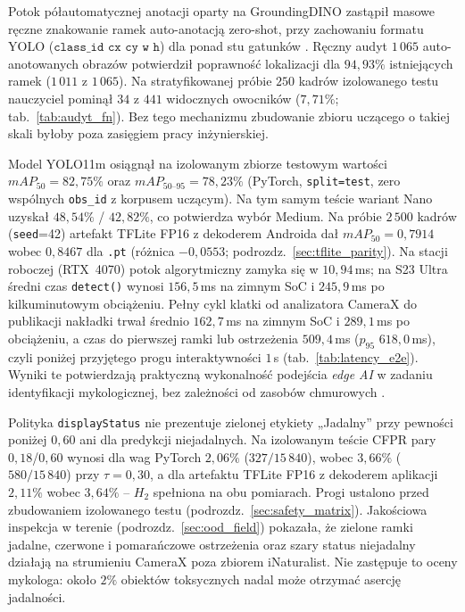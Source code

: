Potok półautomatycznej anotacji oparty na GroundingDINO zastąpił masowe ręczne znakowanie ramek auto-anotacją zero-shot, przy zachowaniu formatu YOLO ($\texttt{class\_id cx cy w h}$) dla ponad stu gatunków \cite{liu2023grounding}. Ręczny audyt $1\,065$ auto-anotowanych obrazów potwierdził poprawność lokalizacji dla $94{,}93\%$ istniejących ramek ($1\,011$ z $1\,065$). Na stratyfikowanej próbie $250$ kadrów izolowanego testu nauczyciel pominął $34$ z $441$ widocznych owocników ($7{,}71\%$; tab.~\ref{tab:audyt_fn}). Bez tego mechanizmu zbudowanie zbioru uczącego o takiej skali byłoby poza zasięgiem pracy inżynierskiej.

Model YOLO11m osiągnął na izolowanym zbiorze testowym wartości $mAP_{50}=82{,}75\%$ oraz $mAP_{50\text{--}95}=78{,}23\%$ (PyTorch, \texttt{split=test}, zero wspólnych \texttt{obs\_id} z korpusem uczącym). Na tym samym teście wariant Nano uzyskał $48{,}54\%$ / $42{,}82\%$, co potwierdza wybór Medium. Na próbie $2\,500$ kadrów (\texttt{seed}=42) artefakt TFLite FP16 z dekoderem Androida dał $mAP_{50}=0{,}7914$ wobec $0{,}8467$ dla \texttt{.pt} (różnica $-0{,}0553$; podrozdz.~\ref{sec:tflite_parity}). Na stacji roboczej (RTX~4070) potok algorytmiczny zamyka się w $10{,}94$\,ms; na S23 Ultra średni czas \texttt{detect()} wynosi $156{,}5$\,ms na zimnym SoC i $245{,}9$\,ms po kilkuminutowym obciążeniu. Pełny cykl klatki od analizatora CameraX do publikacji nakładki trwał średnio $162{,}7$\,ms na zimnym SoC i $289{,}1$\,ms po obciążeniu, a czas do pierwszej ramki lub ostrzeżenia $509{,}4$\,ms ($p_{95}$ $618{,}0$\,ms), czyli poniżej przyjętego progu interaktywności $1$\,s (tab.~\ref{tab:latency_e2e}). Wyniki te potwierdzają praktyczną wykonalność podejścia \textit{edge AI} w zadaniu identyfikacji mykologicznej, bez zależności od zasobów chmurowych \cite{ultralytics2024yolo11}.

Polityka \texttt{displayStatus} nie prezentuje zielonej etykiety „Jadalny” przy pewności poniżej $0{,}60$ ani dla predykcji niejadalnych. Na izolowanym teście CFPR pary $0{,}18$/$0{,}60$ wynosi dla wag PyTorch $2{,}06\%$ ($327/15\,840$), wobec $3{,}66\%$ ($580/15\,840$) przy $\tau=0{,}30$, a dla artefaktu TFLite FP16 z dekoderem aplikacji $2{,}11\%$ wobec $3{,}64\%$ -- $H_2$ spełniona na obu pomiarach. Progi ustalono przed zbudowaniem izolowanego testu (podrozdz.~\ref{sec:safety_matrix}). Jakościowa inspekcja w terenie (podrozdz.~\ref{sec:ood_field}) pokazała, że zielone ramki jadalne, czerwone i pomarańczowe ostrzeżenia oraz szary status niejadalny działają na strumieniu CameraX poza zbiorem iNaturalist. Nie zastępuje to oceny mykologa: około $2\%$ obiektów toksycznych nadal może otrzymać asercję jadalności.

